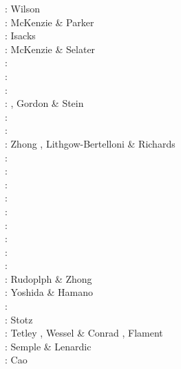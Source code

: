 {\scriptsize
\nineteensixtysix: Wilson \cite{wils66}\\
\nineteensixtyseven: McKenzie \& Parker \cite{mcpa67}\\
\nineteensixtyeight: Isacks \etal \cite{isos68} \\ 
\nineteenseventythree: McKenzie \& Selater \cite{mcse73}\\
\nineteenseventyfour: \cite{sosl74}\\
\nineteenseventyfive: \cite{harp75}\\
\nineteenninety: \cite{dega90}\\
\nineteenninetytwo: \cite{zieg92a}, Gordon \& Stein \cite{gost92}\\
\nineteenninetyfour: \cite{guto94}\\
\nineteenninetyseven: \cite{wean97b}\\
\nineteenninetyeight: Zhong \etal \cite{zhgm98}, Lithgow-Bertelloni \& Richards \cite{liri98}\\
\nineteenninetynine: \cite{ribr99}\\
\twothousandone: \cite{yohk01}\\
\twothousandtwo: \cite{stoc02}\\
\twothousandthree: \cite{evan03}\cite{reta03}\\
\twothousandseven: \cite{zhzl07}\\
\twothousandnine: \cite{lizh09}\cite{vasv09}\cite{iabu09}\cite{scbs09}\\
\twothousandten: \cite{stto10}\cite{dega10}\\
\twothousandtwelve: \cite{huss12}\cite{gutz12}\cite{qumm12}\cite{holr12}\cite{dost12}\cite{shbs12}\\
\twothousandthirteen: \cite{mosq13}\cite{cost13}\\
\twothousandfourteen: Rudoplph \& Zhong \cite{ruzh14} \\
\twothousandfifteen: Yoshida \& Hamano \cite{yoha15}\\
\twothousandsixteen: \cite{pric16}\\
\twothousandseventeen: Stotz \etal \cite{stid17}\\
\twothousandnineteen: Tetley \etal \cite{tewg19}, Wessel \& Conrad \cite{weco19}, 
                      Flament \cite{flam19}\\
\twothousandtwenty: Semple \& Lenardic \cite{sele20}\\
\twothousandtwentyone: Cao \etal \cite{cafm21}
}

